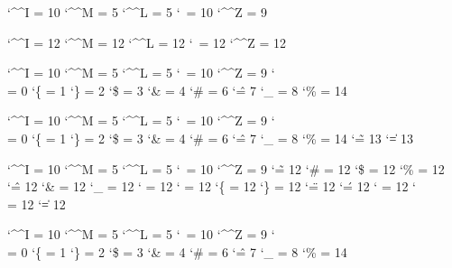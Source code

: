 
\startcatcodetable \nilcatcodes
    \catcode`\^^I = 10 %
    \catcode`\^^M =  5 %
    \catcode`\^^L =  5 %
    \catcode`\    = 10 %
    \catcode`\^^Z =  9 %
\stopcatcodetable

\startcatcodetable \vrbcatcodes %
    \catcode`\^^I = 12
    \catcode`\^^M = 12
    \catcode`\^^L = 12
    \catcode`\    = 12
    \catcode`\^^Z = 12
\stopcatcodetable

\startcatcodetable \texcatcodes
    \catcode`\^^I = 10
    \catcode`\^^M =  5
    \catcode`\^^L =  5
    \catcode`\    = 10
    \catcode`\^^Z =  9
    \catcode`\\   =  0
    \catcode`\{   =  1
    \catcode`\}   =  2
    \catcode`\$   =  3
    \catcode`\&   =  4
    \catcode`\#   =  6
    \catcode`\^   =  7
    \catcode`\_   =  8
    \catcode`\%   = 14
\stopcatcodetable

\startcatcodetable \ctxcatcodes
    \catcode`\^^I = 10
    \catcode`\^^M =  5
    \catcode`\^^L =  5
    \catcode`\    = 10
    \catcode`\^^Z =  9
    \catcode`\\   =  0
    \catcode`\{   =  1
    \catcode`\}   =  2
    \catcode`\$   =  3
    \catcode`\&   =  4
    \catcode`\#   =  6
    \catcode`\^   =  7
    \catcode`\_   =  8
    \catcode`\%   = 14
    \catcode`\~   = 13
    \catcode`\|   = 13
\stopcatcodetable

\startcatcodetable \notcatcodes
    \catcode`\^^I = 10 %
    \catcode`\^^M =  5 %
    \catcode`\^^L =  5 %
    \catcode`\    = 10 %
    \catcode`\^^Z =  9 %
    \catcode`\~   = 12
    \catcode`\#   = 12 %
    \catcode`\$   = 12 %
    \catcode`\%   = 12
    \catcode`\^   = 12
    \catcode`\&   = 12
    \catcode`\_   = 12
    \catcode`\<   = 12
    \catcode`\>   = 12
    \catcode`\{   = 12
    \catcode`\}   = 12
    \catcode`\"   = 12
    \catcode`\'   = 12
    \catcode`\/   = 12
    \catcode`\\   = 12
    \catcode`\|   = 12
\stopcatcodetable

\startcatcodetable \mthcatcodes
    \catcode`\^^I = 10
    \catcode`\^^M =  5
    \catcode`\^^L =  5
    \catcode`\    = 10
    \catcode`\^^Z =  9
    \catcode`\\   =  0
    \catcode`\{   =  1
    \catcode`\}   =  2
    \catcode`\$   =  3
    \catcode`\&   =  4
    \catcode`\#   =  6
    \catcode`\^   =  7
    \catcode`\_   =  8
    \catcode`\%   = 14
\stopcatcodetable


